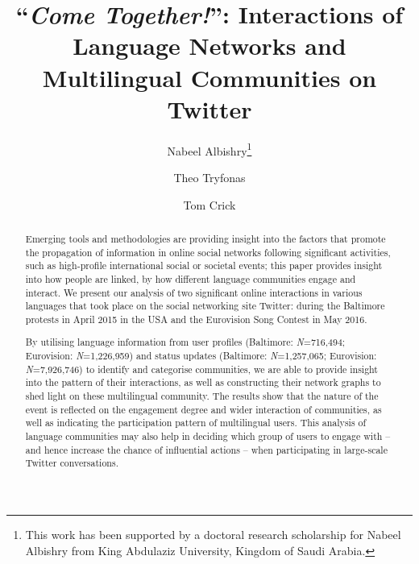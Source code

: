 \documentclass{llncs}
\begin{document}
\title{``{\emph{Come Together!}}'': Interactions of Language Networks and Multilingual Communities on Twitter}

\author{Nabeel Albishry\thanks{This work has been supported by a doctoral research scholarship for
Nabeel Albishry from King Abdulaziz University, Kingdom of Saudi
Arabia.} \and Theo Tryfonas \and Tom
  Crick}



\maketitle

\begin{abstract}
Emerging tools and methodologies are providing insight into the
factors that promote the propagation of information in online social
networks following significant activities, such as high-profile
international social or societal events; this paper provides insight
into how people are linked, by how different language communities
engage and interact. We present our analysis of two significant online
interactions in various languages that took place on the social
networking site Twitter: during the Baltimore protests in April 2015
in the USA and the Eurovision Song Contest in May 2016.

By utilising language information from user profiles (Baltimore:
{\emph{N}}=716,494; Eurovision: {\emph{N}}=1,226,959) and status
updates (Baltimore: {\emph{N}}=1,257,065; Eurovision:
{\emph{N}}=7,926,746) to identify and categorise communities, we are
able to provide insight into the pattern of their interactions, as
well as constructing their network graphs to shed light on these
multilingual community. The results show that the nature of the event
is reflected on the engagement degree and wider interaction of
communities, as well as indicating the participation pattern of
multilingual users. This analysis of language communities may also
help in deciding which group of users to engage with -- and hence
increase the chance of influential actions -- when participating in
large-scale Twitter conversations.
\end{abstract}
\end{document}

